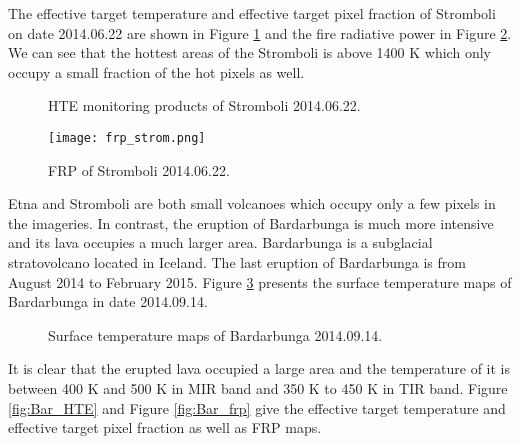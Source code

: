 \noindent The effective target temperature and effective target pixel fraction of Stromboli on date 2014.06.22 are shown in Figure \ref{fig:Strom_HTE} and the fire radiative power in Figure \ref{fig:Strom_frp}. We can see that the hottest areas of the Stromboli is above 1400 K which only occupy a small fraction of the hot pixels as well.\\

\begin{figure}[!htbp]
\centering
{}
\hspace{0.1in}
\caption{HTE monitoring products of Stromboli 2014.06.22.}
\label{fig:Strom_HTE}
\end{figure}

\begin{figure}[!htbp]
\centering
\texttt{[image: frp\_strom.png]}
\caption{FRP of Stromboli 2014.06.22.}
\label{fig:Strom_frp}
\end{figure}

\noindent Etna and Stromboli are both small volcanoes which occupy only a few pixels in the imageries. In contrast, the eruption of Bardarbunga is much more intensive and its lava occupies a much larger area. Bardarbunga is a subglacial stratovolcano located in Iceland. The last eruption of Bardarbunga is from August 2014 to February 2015. Figure \ref{fig:Bar_sur_tem} presents the surface temperature maps of Bardarbunga in date 2014.09.14.\\

\begin{figure}
\centering
{}
\hspace{0.1in}
\caption{Surface temperature maps of Bardarbunga 2014.09.14.}
\label{fig:Bar_sur_tem}
\end{figure}

\noindent It is clear that the erupted lava occupied a large area and the temperature of it is between 400 K and 500 K in MIR band and 350 K to 450 K in TIR band. Figure \ref{fig:Bar_HTE} and Figure \ref{fig:Bar_frp} give the effective target temperature and effective target pixel fraction as well as FRP maps.\\

